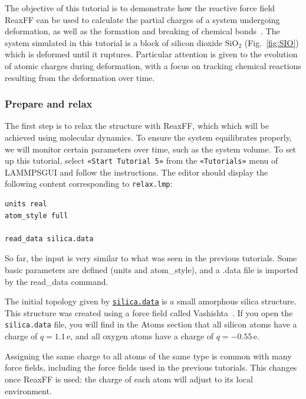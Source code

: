 \documentclass[9pt,tutorial]{livecoms}
\newcommand{\lmpcmd}[1]{\hspace{0pt}\colorbox{listing}{\textcolor{command}{\small{#1}}}\hspace{0pt}} %
\newcommand{\flecmd}[1]{\textcolor{command}{\texttt{#1}}} %
\newcommand{\guicmd}[1]{\textcolor{command}{\texttt{«#1»}}} %
\newcommand{\dwlcmd}[1]{\textcolor{download}{\texttt{#1}}} %
\newcommand{\lammpsgui}{\textsf{LAMMPS\textendash GUI}}
\newcommand{\filepath}{https://raw.githubusercontent.com/lammpstutorials/lammpstutorials-article/main/files/}
\begin{document}
The objective of this tutorial is to demonstrate how the reactive force field ReaxFF
can be used to calculate the partial charges of a system undergoing deformation, as well as
the formation and breaking of chemical bonds~\cite{van2001reaxff, zou2012investigation}.
The system simulated in this tutorial is a block of silicon dioxide $\text{SiO}_2$ (Fig.~\ref{fig:SIO})
which is deformed until it ruptures.  Particular attention is given to the evolution
of atomic charges during deformation, with a focus on tracking chemical reactions
resulting from the deformation over time.

\subsubsection{Prepare and relax}

The first step is to relax the structure with ReaxFF, which which will be achieved using
molecular dynamics.  To ensure the system equilibrates properly, we will monitor certain
parameters over time, such as the system volume.  To set up this
tutorial, select \guicmd{Start Tutorial 5} from the
\guicmd{Tutorials} menu of \lammpsgui{} and follow the instructions.
The editor should display the following content corresponding to \flecmd{relax.lmp}:
\begin{lstlisting}
units real
atom_style full

read_data silica.data

\end{lstlisting}
So far, the input is very similar to what was seen in the previous tutorials.
Some basic parameters are defined (\lmpcmd{units} and \lmpcmd{atom\_style}),
and a \lmpcmd{.data} file is imported by the \lmpcmd{read\_data} command.

The initial topology given by \href{\filepath tutorial5/silica.data}{\dwlcmd{silica.data}}
is a small amorphous silica structure.  This structure was created using a force field called
Vashishta~\cite{vashishta1990interaction}.  If you open the \flecmd{silica.data}
file, you will find in the \lmpcmd{Atoms} section that all silicon atoms have a
charge of $q = 1.1\,\text{e}$, and all oxygen atoms have a charge of $q = -0.55\,\text{e}$.

\begin{note}
Assigning the same charge to all atoms of the same type is common with many
force fields, including the force fields used in the previous tutorials.  This
changes once ReaxFF is used: the charge of each atom will adjust to its local
environment.
\end{note}
\end{document}
